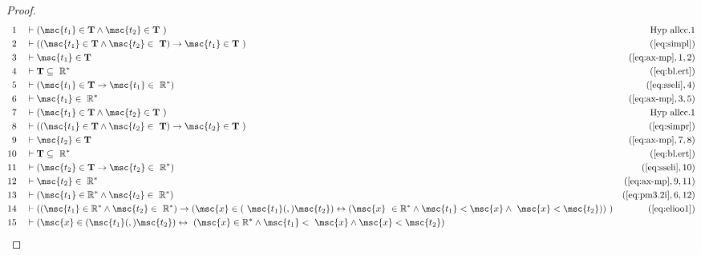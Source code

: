 \begin{proof}
\begin{align}
  1 &&  & \vdash ( \msc{t_1} \in \mathbf{T} \wedge \msc{t_2} \in \mathbf{T}
     ~)&\text{Hyp~allcc.1}\notag%
  \\ 2 &&  & \vdash ( ( \msc{t_1} \in \mathbf{T} \wedge \msc{t_2} \in
     ~\mathbf{T} ) \rightarrow \msc{t_1} \in \mathbf{T}
     ~)&(\mbox{\ref{eq:simpl}})\notag
  \\ 3 &&  & \vdash \msc{t_1} \in \mathbf{T}&(\mbox{\ref{eq:ax-mp}},1,2)\notag
  \\ 4 &&  & \vdash \mathbf{T} \subseteq
     ~\mathbb{R}^{*}&(\mbox{\ref{eq:bl.ert}})\notag
  \\ 5 &&  & \vdash ( \msc{t_1} \in \mathbf{T} \rightarrow \msc{t_1} \in
     ~\mathbb{R}^{*} )&(\mbox{\ref{eq:sseli}},4)\notag
  \\ 6 &&  & \vdash \msc{t_1} \in
     ~\mathbb{R}^{*}&(\mbox{\ref{eq:ax-mp}},3,5)\notag
  \\ 7 &&  & \vdash ( \msc{t_1} \in \mathbf{T} \wedge \msc{t_2} \in \mathbf{T}
     ~)&\text{Hyp~allcc.1}\notag%
  \\ 8 &&  & \vdash ( ( \msc{t_1} \in \mathbf{T} \wedge \msc{t_2} \in
     ~\mathbf{T} ) \rightarrow \msc{t_2} \in \mathbf{T}
     ~)&(\mbox{\ref{eq:simpr}})\notag
  \\ 9 &&  & \vdash \msc{t_2} \in \mathbf{T}&(\mbox{\ref{eq:ax-mp}},7,8)\notag
  \\ 10 &&  & \vdash \mathbf{T} \subseteq
     ~\mathbb{R}^{*}&(\mbox{\ref{eq:bl.ert}})\notag
  \\ 11 &&  & \vdash ( \msc{t_2} \in \mathbf{T} \rightarrow \msc{t_2} \in
     ~\mathbb{R}^{*} )&(\mbox{\ref{eq:sseli}},10)\notag
  \\ 12 &&  & \vdash \msc{t_2} \in
     ~\mathbb{R}^{*}&(\mbox{\ref{eq:ax-mp}},9,11)\notag
  \\ 13 &&  & \vdash ( \msc{t_1} \in \mathbb{R}^{*} \wedge \msc{t_2} \in
     ~\mathbb{R}^{*} )&(\mbox{\ref{eq:pm3.2i}},6,12)\notag
  \\ 14 &&  & \vdash ( ( \msc{t_1} \in \mathbb{R}^{*} \wedge \msc{t_2} \in
     ~\mathbb{R}^{*} ) \rightarrow ( \msc{x} \in (
     ~\msc{t_1} (,) \msc{t_2} ) \leftrightarrow ( \msc{x}
     ~\in \mathbb{R}^{*} \wedge \msc{t_1} < \msc{x} \wedge
     ~\msc{x} < \msc{t_2} ) )
     ~)&(\mbox{\ref{eq:elioo1}})\notag
  \\ 15 &&  & \vdash ( \msc{x} \in ( \msc{t_1} (,) \msc{t_2} ) \leftrightarrow
     ~( \msc{x} \in \mathbb{R}^{*} \wedge \msc{t_1} <
     ~\msc{x} \wedge \msc{x} < \msc{t_2} )

\end{align}
\end{proof}
